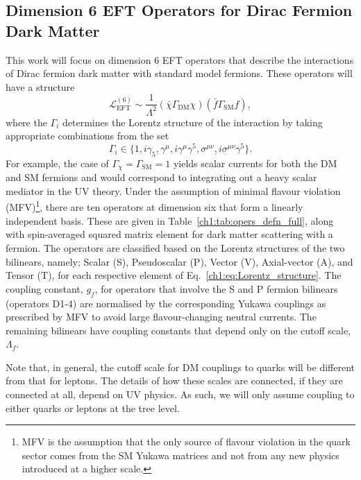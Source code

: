 \subsection{Dimension 6 EFT Operators for Dirac Fermion Dark Matter}
This work will focus on dimension 6 EFT operators that describe the interactions of Dirac fermion dark matter with standard model fermions. These operators will have a structure 
\begin{equation}
    \mathcal{L}_\mathrm{EFT}^{(6)} \sim \frac{1}{\Lambda^2}(\bar{\chi}\Gamma_\mathrm{DM} \chi)(\bar{f}\Gamma_{\mathrm{SM}}f),
\end{equation}
where the $\Gamma_i$ determines the Lorentz structure of the interaction by taking appropriate combinations from the set
\begin{equation}
    \Gamma_i\in \{1, i\gamma_5, \gamma^\mu, i\gamma^\mu \gamma^5, \sigma^{\mu\nu}, i \sigma^{\mu\nu}\gamma^5\}.\label{ch1:eq:Lorentz_structure}
\end{equation}
For example, the case of $\Gamma_\chi = \Gamma_\mathrm{SM} = 1$ yields scalar currents for both the DM and SM fermions and would correspond to integrating out a heavy scalar mediator in the UV theory. Under the assumption of minimal flavour violation (MFV)\footnote{MFV is the assumption that the only source of flavour violation in the quark sector comes from the SM Yukawa matrices and not from any new physics introduced at a higher scale.}, there are ten operators at dimension six that form a linearly independent basis. These are given in Table~\ref{ch1:tab:opers_defn_full}, along with spin-averaged squared matrix element for dark matter scattering with a fermion. 
The operators are classified based on the Lorentz structures of the two bilinears, namely; Scalar (S), Pseudoscalar (P), Vector (V), Axial-vector (A), and Tensor (T), for each respective element of Eq.~\ref{ch1:eq:Lorentz_structure}.
The coupling constant, $g_f$, for operators that involve the S and P fermion bilinears (operators D1-4) are normalised by the corresponding Yukawa couplings as prescribed by MFV to avoid large flavour-changing neutral currents. The remaining bilinears have coupling constants that depend only on the cutoff scale, $\Lambda_f$.

Note that, in general, the cutoff scale for DM couplings to quarks will be different from that for leptons. The details of how these scales are connected, if they are connected at all, depend on UV physics. As such, we will only assume coupling to either quarks or leptons at the tree level. 


